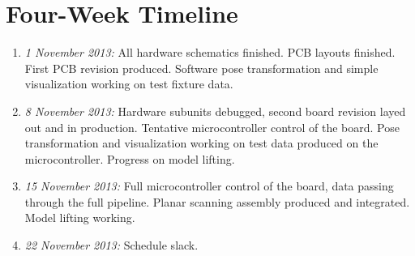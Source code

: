 \documentclass{article}
\begin{document}
\section{Four-Week Timeline}

\begin{enumerate}
\item \emph{1 November 2013:} All hardware schematics finished.  PCB layouts
  finished.  First PCB revision produced.  Software pose transformation and
  simple visualization working on test fixture data.
\item \emph{8 November 2013:} Hardware subunits debugged, second board revision
  layed out and in production.  Tentative microcontroller control of the board.
  Pose transformation and visualization working on test data produced on the
  microcontroller.  Progress on model lifting.
\item \emph{15 November 2013:} Full microcontroller control of the board, data
  passing through the full pipeline.  Planar scanning assembly produced and
  integrated.  Model lifting working.
\item \emph{22 November 2013:} Schedule slack.
\end{enumerate}
\end{document}
